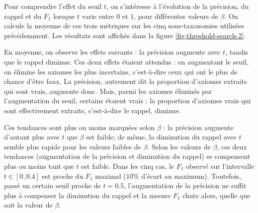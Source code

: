 Pour comprendre l'effet du seuil $t$, on s'intéresse à l'évolution de la précision, du rappel et du $F_1$ lorsque $t$ varie entre $0$ et $1$, pour différentes valeurs de $\beta$. On calcule la moyenne de ces trois métriques sur les cinq sous-taxonomies utilisées précédemment. Les résultats sont affichés dans la figure \ref{fig:threshold-search-2}.

En moyenne, on observe les effets suivants : la précision augmente avec $t$, tandis que le rappel diminue. Ces deux effets étaient attendus : en augmentant le seuil, on élimine les axiomes les plus incertains, c'est-à-dire ceux qui ont le plus de chance d'être faux. La précision, autrement dit la proportion d'axiomes extraits qui sont vrais, augmente donc. Mais, parmi les axiomes éliminés par l'augmentation du seuil, certains étaient vrais : la proportion d'axiomes vrais qui sont effectivement extraits, c'est-à-dire le rappel, diminue.

Ces tendances sont plus ou moins marquées selon $\beta$ : la précision augmente d'autant plus avec $t$ que $\beta$ est faible; de même, la diminution du rappel avec $t$ semble plus rapide pour les valeurs faibles de $\beta$. Selon les valeurs de $\beta$, ces deux tendances (augmentation de la précision et diminution du rappel) se compensent plus ou moins tant que $t$ est faible. Dans les cinq cas, le $F_1$ observé sur l'intervalle $t \in [0, 0.4]$ est proche du $F_1$ maximal ($10\%$ d'écart au maximum). Toutefois, passé un certain seuil proche de $t=0.5$, l'augmentation de la précision ne suffit plus à compenser la diminution du rappel et la mesure $F_1$ chute alors, quelle que soit la valeur de $\beta$.

%
%
%

